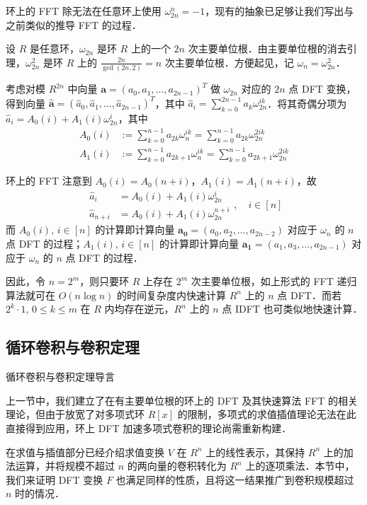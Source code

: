 \documentclass[fontset=fandol]{ctexbeamer}
\renewcommand{\vec}{\boldsymbol}
\begin{document}
\begin{frame}{环上的 FFT}
    除无法在任意环上使用 $\omega_{2n}^n = -1$，现有的抽象已足够让我们写出与之前类似的推导 FFT 的过程．
    
    设 $R$ 是任意环，$\omega_{2n}$ 是环 $R$ 上的一个 $2n$ 次主要单位根．由主要单位根的消去引理，$\omega_{2n}^2$ 是环 $R$ 上的 $\frac {2n}{\gcd(2n,2)} = n$ 次主要单位根．方便起见，记 $\omega_n = \omega_{2n}^2$．
    
    考虑对模 $R^{2n}$ 中向量 $\vec a = \left( a_0,a_1,\dots,a_{2n-1} \right)^T$ 做 $\omega_{2n}$ 对应的 $2n$ 点 DFT 变换，得到向量 $\hat{\vec a} = \left( \hat a_0, \hat a_1, \dots, \hat a_{2n-1} \right)^T$，其中 $\hat a_i = \sum_{k=0}^{2n-1} a_k \omega_{2n}^{ik}$．将其奇偶分项为 $\hat a_i=A_0(i)+A_1(i) \omega_{2n}^i$，其中
    \[ \begin{aligned}
    A_0(i) &:= \sum_{k=0}^{n-1} a_{2k} \omega_{n}^{ik} = \sum_{k=0}^{n-1} a_{2k} \omega_{2n}^{2ik} \\
    A_1(i) &:= \sum_{k=0}^{n-1} a_{2k+1} \omega_{n}^{ik} = \sum_{k=0}^{n-1} a_{2k+1} \omega_{2n}^{2ik}
    \end{aligned} \]
\end{frame}

\begin{frame}{环上的 FFT}
    注意到 $A_0(i)=A_0(n+i)$，$A_1(i)=A_1(n+i)$，故
    \[ \begin{aligned}
    \hat a_i     &= A_0(i) + A_1(i) \omega_{2n}^i \\
    \hat a_{n+i} &= A_0(i) + A_1(i) \omega_{2n}^{n+i}
    \end{aligned},\quad i \in [n]
    \]
    而 $A_0(i),\, i \in [n]$ 的计算即计算向量 $\vec{a_0} = \left( a_0, a_2, \dots, a_{2n-2} \right)$ 对应于 $\omega_n$ 的 $n$ 点 DFT 的过程；$A_1(i),\, i \in [n]$ 的计算即计算向量 $\vec{a_1} = \left( a_1, a_3, \dots, a_{2n-1} \right)$ 对应于 $\omega_n$ 的 $n$ 点 DFT 的过程．

    因此，令 $n = 2^m$，则只要环 $R$ 上存在 $2^m$ 次主要单位根，如上形式的 FFT 递归算法就可在 $O(n \log n)$ 的时间复杂度内快速计算 $R^n$ 上的 $n$ 点 DFT．而若 $2^k \cdot 1,\, 0 \leq k \leq m$ 在 $R$ 内均存在逆元，$R^n$ 上的 $n$ 点 IDFT 也可类似地快速计算．
\end{frame}

\subsection{循环卷积与卷积定理}

\begin{frame}{循环卷积与卷积定理}{导言}

上一节中，我们建立了在有主要单位根的环上的 DFT 及其快速算法 FFT 的相关理论，但由于放宽了对多项式环 $R[x]$ 的限制，多项式的求值插值理论无法在此直接得到应用，环上 DFT 加速多项式卷积的理论尚需重新构建．

在求值与插值部分已经介绍求值变换 $V$ 在 $R^n$ 上的线性表示，其保持 $R^n$ 上的加法运算，并将规模不超过 $n$ 的两向量的卷积转化为 $R^n$ 上的逐项乘法．本节中，我们来证明 DFT 变换 $F$ 也满足同样的性质，且将这一结果推广到卷积规模超过 $n$ 时的情况．

\end{frame}
\end{document}

